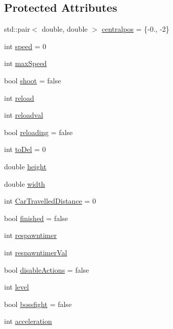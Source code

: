 \subsection*{Protected Attributes}
\begin{DoxyCompactItemize}
\item 
std\+::pair$<$ double, double $>$ \hyperlink{classroadfighter_1_1PlayerCar_acc6e2a39d0421a4dcfb50e22d9a1b961}{centralpos} = \{-\/0., -\/2\}
\item 
int \hyperlink{classroadfighter_1_1PlayerCar_a0e6307f59c765c9b88ec2b1f0f8f07fc}{speed} = 0
\item 
int \hyperlink{classroadfighter_1_1PlayerCar_ae597eb0dcbff6ceccc5dd43d202503a4}{max\+Speed}
\item 
bool \hyperlink{classroadfighter_1_1PlayerCar_a57eeee2b8052155f25f37c0343ea0ecc}{shoot} = false
\item 
int \hyperlink{classroadfighter_1_1PlayerCar_a97dc2e80fcacfe2fabdb4684de15e19b}{reload}
\item 
int \hyperlink{classroadfighter_1_1PlayerCar_ae4043388c6399f4a1341b9e9b879ba0a}{reloadval}
\item 
bool \hyperlink{classroadfighter_1_1PlayerCar_a9ee8c58f93057786b6d184ed73636c14}{reloading} = false
\item 
int \hyperlink{classroadfighter_1_1PlayerCar_a44cdcc6dea044b424d852dc01b8728f1}{to\+Del} = 0
\item 
double \hyperlink{classroadfighter_1_1PlayerCar_aa1e63b489ae2b5400fdd159fcea03417}{height}
\item 
double \hyperlink{classroadfighter_1_1PlayerCar_aeb7ba30397f5c61a94f4630d8ac1d2c9}{width}
\item 
int \hyperlink{classroadfighter_1_1PlayerCar_a57dd797c06cab823a4210eb73aed07b7}{Car\+Travelled\+Distance} = 0
\item 
bool \hyperlink{classroadfighter_1_1PlayerCar_a4b35caad02ea04a6acc0c8e9e649bce3}{finished} = false
\item 
int \hyperlink{classroadfighter_1_1PlayerCar_af50c73327950a35fe1d906246cc9b008}{respawntimer}
\item 
int \hyperlink{classroadfighter_1_1PlayerCar_aca1f3db779c605745f92e72c08925a7e}{respawntimer\+Val}
\item 
bool \hyperlink{classroadfighter_1_1PlayerCar_ac2b0e5cd761fb485853c288080a66b6d}{disable\+Actions} = false
\item 
int \hyperlink{classroadfighter_1_1PlayerCar_ac198b0404bf9105cf835bf25303e63db}{level}
\item 
bool \hyperlink{classroadfighter_1_1PlayerCar_a3dfbd9298fcfc470d4583778eaebe67b}{bossfight} = false
\item 
int \hyperlink{classroadfighter_1_1PlayerCar_accc524af68300b7b817d11ea2b989890}{acceleration}
\end{DoxyCompactItemize}


